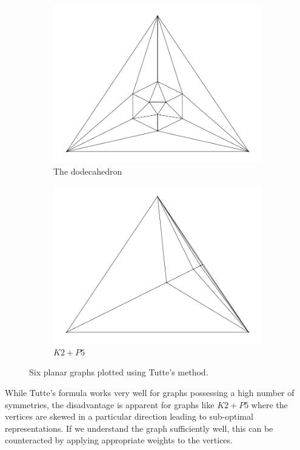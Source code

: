 \documentclass[12pt]{article}
\begin{document}
\begin{figure}[H]
\begin{subfigure}[b]{0.3\textwidth}
          \centering 
          \includegraphics[width = \textwidth]{../output/Q1-platonic-20.pdf}
          \caption{The dodecahedron}
      \end{subfigure}
      \hfill
      \begin{subfigure}[b]{0.3\textwidth}
          \centering 
          \includegraphics[width = \textwidth]{../output/Q1-k2-plus-p5.pdf}
          \caption{\(K2+P5\)}
      \end{subfigure}
      \hfill
      \caption{Six planar graphs plotted using Tutte's method.}
  \end{figure}
  While Tutte's formula works very well for graphs possessing a high number of
  symmetries, the disadvantage is apparent for graphs like \(K2+P5\) where the
  vertices are skewed in a particular direction leading to sub-optimal
  representations. If we understand the graph sufficiently well, this can be
  counteracted by applying appropriate weights to the vertices.
\end{document}
